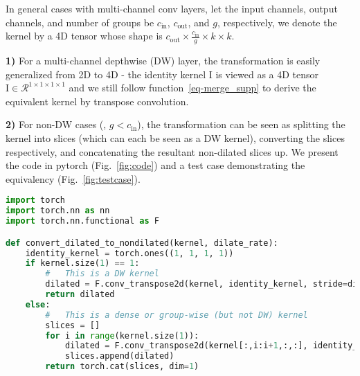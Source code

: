 \documentclass[10pt,twocolumn,letterpaper]{article}
\begin{document}
In general cases with multi-channel conv layers, let the input channels, output channels, and number of groups be $c_{\text{in}}$, $c_{\text{out}}$, and $g$, respectively, we denote the kernel by a 4D tensor whose shape is $c_{\text{out}} \times \frac{c_{\text{in}}}{g} \times k\times k$. 

\textbf{1)} For a multi-channel depthwise (DW) layer, the transformation is easily generalized from 2D to 4D - the identity kernel $\mathrm{I}$ is viewed as a 4D tensor $\mathrm{I}\in\mathcal{R}^{1\times1\times1\times1}$ and we still follow function~\ref{eq-merge_supp} to derive the equivalent kernel by transpose convolution.

\textbf{2)} For non-DW cases (\ie, $g < c_{\text{in}}$), the transformation can be seen as splitting the kernel into slices (which can each be seen as a DW kernel), converting the slices respectively, and concatenating the resultant non-dilated slices up. We present the code in pytorch (Fig.~\ref{fig:code}) and a test case demonstrating the equivalency (Fig.~\ref{fig:testcase}).



\begin{figure*}
    \begin{lstlisting}[language=Python]
import torch
import torch.nn as nn
import torch.nn.functional as F

def convert_dilated_to_nondilated(kernel, dilate_rate):
    identity_kernel = torch.ones((1, 1, 1, 1))
    if kernel.size(1) == 1:
        #   This is a DW kernel
        dilated = F.conv_transpose2d(kernel, identity_kernel, stride=dilate_rate)
        return dilated
    else:
        #   This is a dense or group-wise (but not DW) kernel
        slices = []
        for i in range(kernel.size(1)):
            dilated = F.conv_transpose2d(kernel[:,i:i+1,:,:], identity_kernel, stride=dilate_rate)
            slices.append(dilated)
        return torch.cat(slices, dim=1)
    \end{lstlisting}
    \caption{Pytorch code to convert a dilated conv layer's small kernel to a non-dilated layer's larger sparse kernel.}
    \label{fig:code}
\end{figure*}
\end{document}
